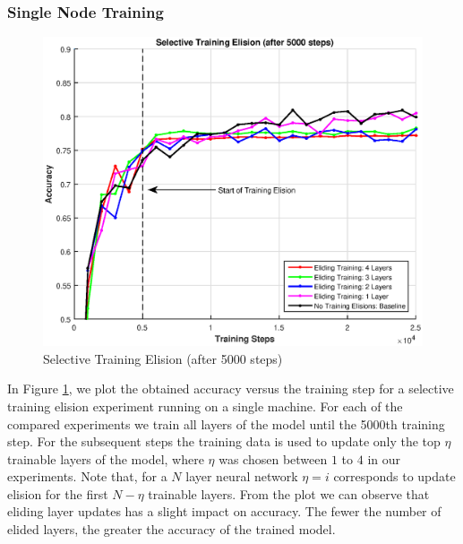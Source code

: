\subsubsection{Single Node Training}
\begin{figure}[t]
	\centering
	\includegraphics[width=0.8\columnwidth]{figures/approx.eps}
	\caption{Selective Training Elision (after 5000 steps)}
	\label{fig:approx}
\end{figure}

In Figure \ref{fig:approx}, we plot the obtained accuracy versus the training step for a selective training elision experiment running on a single machine. For each of the compared experiments we train all layers of the model until the 5000th training step. For the subsequent steps the training data is used to update only the top $\eta$ trainable layers of the model, where $\eta$ was chosen between $1$ to $4$ in our experiments. Note that, for a $N$ layer neural network $\eta=i$ corresponds to update elision for the first $N-\eta$ trainable layers. From the plot we can observe that eliding layer updates has a slight impact on accuracy. The fewer the number of elided layers, the greater the accuracy of the trained model. 

